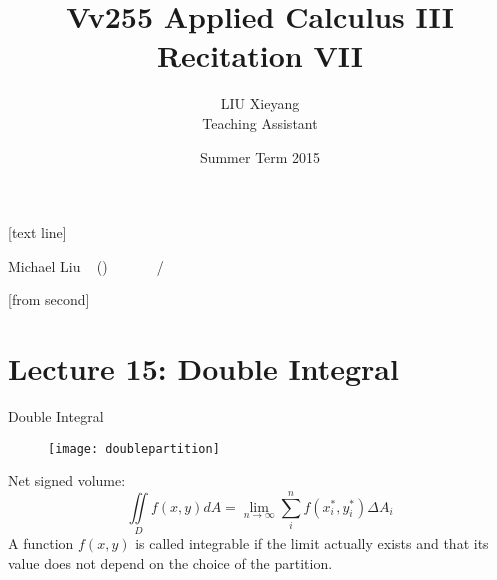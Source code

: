 \documentclass[10pt]{beamer}
\begin{document}



[text line]{%
	\color{blue!40!black}\parbox{\linewidth}{\vspace*{-8pt}Michael Liu ~ (\insertshortinstitute)\hfill\insertshorttitle\hfill\insertshortdate~~~~~~\insertframenumber{}~/~\inserttotalframenumber}}


[from second] 

\newcommand{\tabincell}[2]{\begin{tabular}{@{}#1@{}}#2\end{tabular}}


\title[Vv255 Applied Calculus III]{Vv255 Applied Calculus III\\{\small Recitation VII}}   
\author[Michael Liu]{LIU Xieyang\\{\tiny Teaching Assistant}} 
\date[Summer 2015]{Summer Term 2015} 
\begin{frame}
	\titlepage
\end{frame}






\section{Lecture 15: Double Integral} 



\begin{frame}[allowframebreaks]{Double Integral}
	\begin{figure}[H]
		\centering
		\texttt{[image: doublepartition]}
	\end{figure}
	Net signed volume:
	$$\iint\limits_{D} f(x,y) dA = \lim\limits_{n\rightarrow \infty}\sum_{i}^{n}f(x_i^*,y_i^*)\Delta A_i$$
A function $f (x, y)$ is called {\color{red} integrable} if the limit actually exists and that its
value does not depend on the choice of the partition.
\end{frame}
\end{document}
